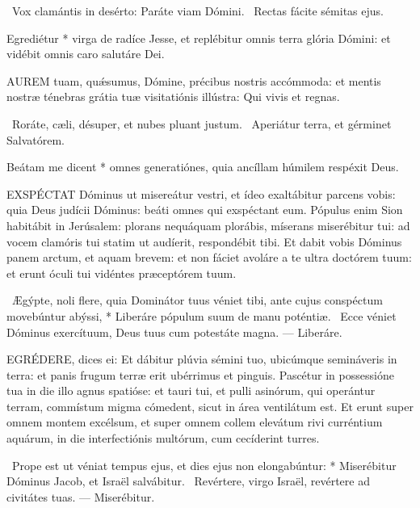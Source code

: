 \V\ Vox clamántis in desérto: Paráte viam Dómini. \R\ Rectas fácite sémitas ejus.

 Egrediétur * virga de radíce Jesse, et replébitur omnis terra glória Dómini: et vidébit omnis caro salutáre Dei.


\lettrine[lines=2]{A}{UREM} tuam, quǽsumus, Dómine, précibus nostris accómmoda: et mentis nostræ ténebras grátia tuæ visitatiónis illústra: Qui vivis et regnas.

\V\ Roráte, cæli, désuper, et nubes pluant justum. \R\ Aperiátur terra, et gérminet Salvatórem.

 Beátam me dicent * omnes generatiónes, quia ancíllam húmilem respéxit Deus.


\sectionornament




\lettrine[lines=2]{E}{XSPÉCTAT} Dóminus ut misereátur vestri, et ídeo exaltábitur parcens vobis: quia Deus judícii Dóminus: beáti omnes qui exspéctant eum. Pópulus enim Sion habitábit in Jerúsalem: plorans nequáquam plorábis, míserans miserébitur tui: ad vocem clamóris tui statim ut audíerit, respondébit tibi. Et dabit vobis Dóminus panem arctum, et aquam brevem: et non fáciet avoláre a te ultra doctórem tuum: et erunt óculi tui vidéntes præceptórem tuum.

\R\ Ægýpte, noli flere, quia Dominátor tuus véniet tibi, ante cujus conspéctum movebúntur abýssi, * Liberáre pópulum suum de manu poténtiæ. \V\ Ecce véniet Dóminus exercítuum, Deus tuus cum potestáte magna. --- Liberáre.


\lettrine[lines=2]{E}{GRÉDERE}, dices ei: Et dábitur plúvia sémini tuo, ubicúmque semináveris in terra: et panis frugum terræ erit ubérrimus et pinguis. Pascétur in possessióne tua in die illo agnus spatióse: et tauri tui, et pulli asinórum, qui operántur terram, commístum migma cómedent, sicut in área ventilátum est. Et erunt super omnem montem excélsum, et super omnem collem elevátum rivi curréntium aquárum, in die interfectiónis multórum, cum cecíderint turres.

\R\ Prope est ut véniat tempus ejus, et dies ejus non elongabúntur: * Miserébitur Dóminus Jacob, et Israël salvábitur. \V\ Revértere, virgo Israël, revértere ad civitátes tuas. --- Miserébitur.

